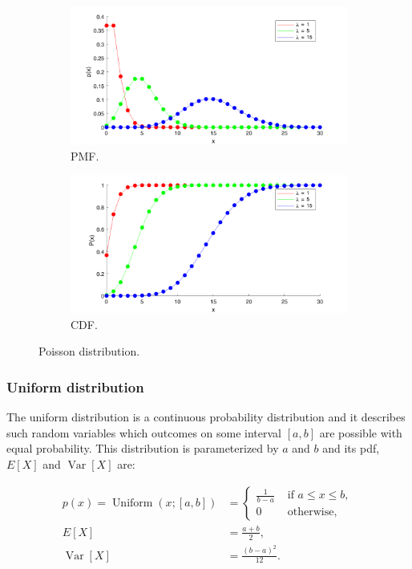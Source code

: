 \begin{figure}
\centering
\begin{subfigure}{.5\textwidth}
  \centering
  \includegraphics[width=.9\linewidth]{figures/poisson.pmf.png}
  \caption{PMF.}
  \label{fig:poisson:pmf}
\end{subfigure}\hfill
\begin{subfigure}{.5\textwidth}
  \centering
  \includegraphics[width=.9\linewidth]{figures/poisson.cdf.png}
  \caption{CDF.}
  \label{fig:poisson:cdf}
\end{subfigure}
\caption{Poisson distribution.}
\label{fig:poisson}
\end{figure}

\subsubsection{Uniform distribution}

The uniform distribution is a continuous probability distribution and it
describes such random variables which outcomes on some interval $[a, b]$
are possible with equal probability. This distribution is parameterized by
$a$ and $b$ and its pdf, $E[X]$ and $\operatorname{Var}[X]$ are:

$$
\begin{aligned}
    p(x)
        =\operatorname{Uniform}(x; [a, b])
        &= \begin{cases}
            \frac{1}{b-a} & \text { if } a \leq x \leq b, \\
            0 & \text { otherwise, }
        \end{cases} \\
    E[X] &= \frac{a + b}{2}, \\
    \operatorname{Var}[X] &= \frac{(b - a)^2}{12}.
\end{aligned}
$$

